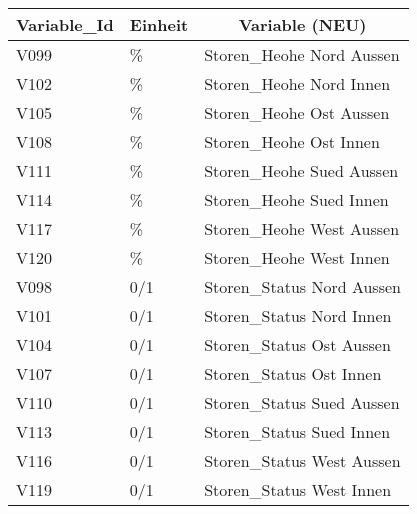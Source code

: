 \begin{table}[htbp]
  \centering
   \scriptsize
    \begin{tabular}{|l|l|l|}
    \hline
    \multicolumn{1}{|c|}{\textbf{Variable\_Id}} & \multicolumn{1}{c|}{\textbf{Einheit}} & \multicolumn{1}{c|}{\textbf{Variable (NEU)}} \bigstrut\\      
    \hline
    \rowcolor[rgb]{ .863,  .902,  .945} V099 & \%   & Storen\_Heohe Nord Aussen   \bigstrut\\
    \hline
    \rowcolor[rgb]{ .863,  .902,  .945} V102 & \%   & Storen\_Heohe Nord Innen   \bigstrut\\
    \hline
    \rowcolor[rgb]{ .863,  .902,  .945} V105 & \%   & Storen\_Heohe Ost Aussen   \bigstrut\\
    \hline
    \rowcolor[rgb]{ .863,  .902,  .945} V108 & \%   & Storen\_Heohe Ost Innen   \bigstrut\\
    \hline
    \rowcolor[rgb]{ .863,  .902,  .945} V111 & \%   & Storen\_Heohe Sued Aussen   \bigstrut\\
    \hline
    \rowcolor[rgb]{ .863,  .902,  .945} V114 & \%   & Storen\_Heohe Sued Innen   \bigstrut\\
    \hline
    \rowcolor[rgb]{ .863,  .902,  .945} V117 & \%   & Storen\_Heohe West Aussen   \bigstrut\\
    \hline
    \rowcolor[rgb]{ .863,  .902,  .945} V120 & \%   & Storen\_Heohe West Innen   \bigstrut\\
    \hline
    \rowcolor[rgb]{ .992,  .914,  .851} V098 & 0/1  & Storen\_Status Nord Aussen   \bigstrut\\
    \hline
    \rowcolor[rgb]{ .992,  .914,  .851} V101 & 0/1  & Storen\_Status Nord Innen   \bigstrut\\
    \hline
    \rowcolor[rgb]{ .992,  .914,  .851} V104 & 0/1  & Storen\_Status Ost Aussen   \bigstrut\\
    \hline
    \rowcolor[rgb]{ .992,  .914,  .851} V107 & 0/1  & Storen\_Status Ost Innen   \bigstrut\\
    \hline
    \rowcolor[rgb]{ .992,  .914,  .851} V110 & 0/1  & Storen\_Status Sued Aussen   \bigstrut\\
    \hline
    \rowcolor[rgb]{ .992,  .914,  .851} V113 & 0/1  & Storen\_Status Sued Innen   \bigstrut\\
    \hline
    \rowcolor[rgb]{ .992,  .914,  .851} V116 & 0/1  & Storen\_Status West Aussen   \bigstrut\\
    \hline
    \rowcolor[rgb]{ .992,  .914,  .851} V119 & 0/1  & Storen\_Status West Innen   \bigstrut\\

\end{tabular}
\end{table}
